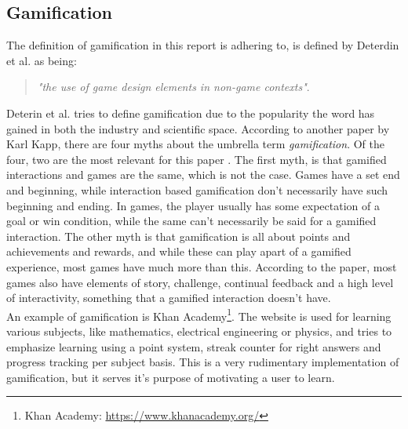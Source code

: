 \subsection{Gamification}
    The definition of gamification in this report is adhering to, is defined by Deterdin et al. as being: \begin{quote}
        \textit{"the use of game design elements in non-game contexts"}\cite{gamification}.
    \end{quote}
    Deterin et al. tries to define gamification due to the popularity the word has gained in both the industry and scientific space\cite{gamification}. According to another paper by Karl Kapp\cite{gamificationMyths}, there are four myths about the umbrella term \textit{gamification}\cite{gamificationMyths}. Of the four, two are the most relevant for this paper . The first myth, is that gamified interactions and games are the same, which is not the case\cite{gamificationMyths}. Games have a set end and beginning, while interaction based gamification don't necessarily have such beginning and ending\cite{gamificationMyths}. In games, the player usually has some expectation of a goal or win condition, while the same can't necessarily be said for a gamified interaction\cite{gamificationMyths}. The other myth is that gamification is all about points and achievements and rewards, and while these can play apart of a gamified experience, most games have much more than this\cite{gamificationMyths}. According to the paper, most games also have elements of story, challenge, continual feedback and a high level of interactivity, something that a gamified interaction doesn't have\cite{gamificationMyths}.\\
    
    An example of gamification is Khan Academy\footnote{Khan Academy: \url{https://www.khanacademy.org/}}. The website is used for learning various subjects, like mathematics, electrical engineering or physics, and tries to emphasize learning using a point system, streak counter for right answers and progress tracking per subject basis\cite{khanacademyGamfication}. This is a very rudimentary implementation of gamification, but it serves it's purpose of motivating a user to learn\cite{khanacademyGamfication}.

